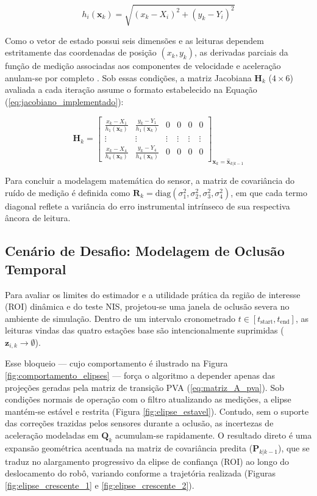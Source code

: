 \begin{equation}
    \label{eq:modelo_distancia_nao_linear}
    h_i(\mathbf{x}_k) = \sqrt{(x_k - X_i)^2 + (y_k - Y_i)^2}
\end{equation}

Como o vetor de estado possui seis dimensões e as leituras dependem estritamente das coordenadas de posição $(x_k, y_k)$, as derivadas parciais da função de medição associadas aos componentes de velocidade e aceleração anulam-se por completo \cite{barshalom2001estimation}. Sob essas condições, a matriz Jacobiana $\mathbf{H}_k$ ($4 \times 6$) avaliada a cada iteração assume o formato estabelecido na Equação (\ref{eq:jacobiano_implementado}):

\begin{equation}
    \label{eq:jacobiano_implementado}
    \mathbf{H}_k = \begin{bmatrix} 
    \frac{x_k - X_1}{h_1(\mathbf{x}_k)} & \frac{y_k - Y_1}{h_1(\mathbf{x}_k)} & 0 & 0 & 0 & 0 \\ 
    \vdots & \vdots & \vdots & \vdots & \vdots & \vdots \\ 
    \frac{x_k - X_4}{h_4(\mathbf{x}_k)} & \frac{y_k - Y_4}{h_4(\mathbf{x}_k)} & 0 & 0 & 0 & 0 
    \end{bmatrix}_{\mathbf{x}_k = \hat{\mathbf{x}}_{k|k-1}}
\end{equation}

Para concluir a modelagem matemática do sensor, a matriz de covariância do ruído de medição é definida como $\mathbf{R}_k = \text{diag}(\sigma_1^2, \sigma_2^2, \sigma_3^2, \sigma_4^2)$, em que cada termo diagonal reflete a variância do erro instrumental intrínseco de sua respectiva âncora de leitura.


\subsection{Cenário de Desafio: Modelagem de Oclusão Temporal}
\label{subsec:occlusion_challenge}

Para avaliar os limites do estimador e a utilidade prática da região de interesse (ROI) dinâmica e do teste NIS, projetou-se uma janela de oclusão severa no ambiente de simulação. Dentro de um intervalo cronometrado $t \in [t_{\text{start}}, t_{\text{end}}]$, as leituras vindas das quatro estações base são intencionalmente suprimidas ($\mathbf{z}_{i,k} \to \emptyset$).

Esse bloqueio — cujo comportamento é ilustrado na Figura \ref{fig:comportamento_elipses} — força o algoritmo a depender apenas das projeções geradas pela matriz de transição PVA (\ref{eq:matriz_A_pva}). Sob condições normais de operação com o filtro atualizando as medições, a elipse mantém-se estável e restrita (Figura \ref{fig:elipse_estavel}). Contudo, sem o suporte das correções trazidas pelos sensores durante a oclusão, as incertezas de aceleração modeladas em $\mathbf{Q}_k$ acumulam-se rapidamente. O resultado direto é uma expansão geométrica acentuada na matriz de covariância predita ($\mathbf{P}_{k|k-1}$), que se traduz no alargamento progressivo da elipse de confiança (ROI) ao longo do deslocamento do robô, variando conforme a trajetória realizada (Figuras \ref{fig:elipse_crescente_1} e \ref{fig:elipse_crescente_2}).


